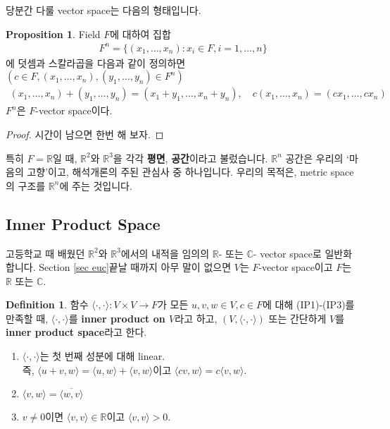 \documentclass[12pt]{article}
\theoremstyle{definition}
\newtheorem{prop}[thm]{Proposition}
\newtheorem{defn}[thm]{Definition}
\def\RR{\mathbb{R}}
\def\CC{\mathbb{C}}
\newcommand{\inner}[2]{\langle #1, #2\rangle}
\begin{document}
당분간 다룰 vector space는 다음의 형태입니다.

	\begin{prop}
		Field \(F\)에 대하여 집합
		\begin{gather*}
			F^n = \{(x_1, \ldots, x_n): x_i \in F, i = 1, \ldots, n\}
		\end{gather*}
		에 덧셈과 스칼라곱을 다음과 같이 정의하면 \((c \in F, (x_1, \ldots, x_n), (y_1, \ldots, y_n) \in F^n)\)
		\begin{gather*}
			(x_1, \ldots, x_n) + (y_1, \ldots, y_n) = (x_1 + y_1, \ldots, x_n + y_n), \quad c(x_1, \ldots, x_n) = (cx_1, \ldots, cx_n)
		\end{gather*}
		\(F^n\)은 \(F\)-vector space이다.
	\end{prop}
	\begin{proof}
		시간이 남으면 한번 해 보자.
	\end{proof}


특히 \(F=\RR\)일 때, \(\RR^2\)와 \(\RR^3\)을 각각 \textbf{평면}, \textbf{공간}이라고 불렀습니다. \(\RR^n\) 공간은 우리의 `마음의 고향'이고, 해석개론의 주된 관심사 중 하나입니다. 우리의 목적은, metric space의 구조를 \(\mathbb{R}^n\)에 주는 것입니다.

\subsection{Inner Product Space}
고등학교 때 배웠던 \(\mathbb{R}^2\)와 \(\mathbb{R}^3\)에서의 내적을 임의의 \(\RR\)- 또는 \(\CC\)- vector space로 일반화합니다. Section \ref{sec euc}\이 끝날 때까지 아무 말이 없으면 \(V\)는 \(F\)-vector space이고 \(F\)는 \(\RR\) 또는 \(\CC\).

	\begin{defn}
		함수 \(\inner{\cdot}{\cdot}: V \times V \rightarrow F\)가 모든 \(u, v, w \in V, c \in F\)에 대해 (IP1)-(IP3)를 만족할 때, \(\inner{\cdot}{\cdot}\)를 \textbf{inner product on \(V\)}라고 하고, \((V, \inner{\cdot}{\cdot})\) 또는 간단하게 \(V\)를 \textbf{inner product space}라고 한다.
		\begin{enumerate}[label=(IP\arabic*), leftmargin=2\parindent]
			\item
			\(\inner{\cdot}{\cdot}\)는 첫 번째 성분에 대해 linear.\\
			즉, \(\inner{u+v}{w} = \inner{u}{w}+ \inner{v}{w}\)이고 \(\inner{cv}{w} = c\inner{v}{w}\).
			\item
			\(\inner{v}{w} = \overline{\inner{w}{v}}\)
			\item
			\(v \neq 0\)이면 \(\inner{v}{v} \in \mathbb{R}\)이고 \(\inner{v}{v} > 0\).
		\end{enumerate}
	\end{defn}
\end{document}
